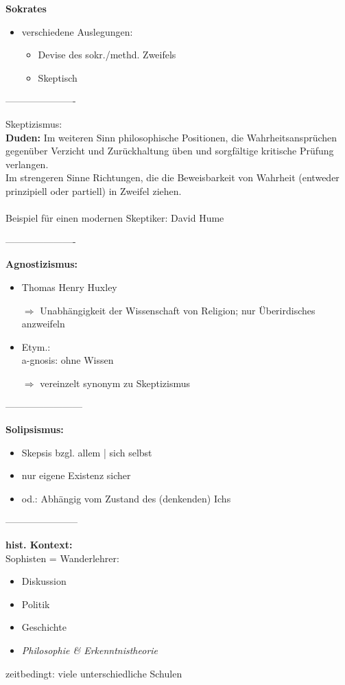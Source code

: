 \documentclass[12pt,a4paper]{article}
\begin{document}
\textbf{Sokrates}
\begin{itemize}
\item verschiedene Auslegungen:
\begin{itemize}
\item Devise des sokr./methd. Zweifels
\item Skeptisch
\end{itemize}
\end{itemize}

----------------------

Skeptizismus:\\
\textbf{Duden:} \glqq Im weiteren Sinn philosophische Positionen, die Wahrheitsansprüchen gegenüber Verzicht und Zurückhaltung üben und sorgfältige kritische Prüfung verlangen.\\
Im strengeren Sinne Richtungen, die die Beweisbarkeit von Wahrheit (entweder prinzipiell oder partiell) in Zweifel ziehen.\grqq\\
\ \\
Beispiel für einen modernen Skeptiker: David Hume

----------------------

\textbf{Agnostizismus:}
\begin{itemize}
\item Thomas Henry Huxley
\item[$\Rightarrow$] Unabhängigkeit der Wissenschaft von Religion; nur Überirdisches anzweifeln
\item Etym.: \\
a-gnosis: \glqq ohne Wissen\grqq\
\item[$\Rightarrow$] vereinzelt synonym zu Skeptizismus
\end{itemize}

------------------------

\textbf{Solipsismus:}
\begin{itemize}
\item Skepsis bzgl. allem | sich selbst
\item nur eigene Existenz sicher
\item od.: Abhängig vom Zustand des (denkenden) Ichs
\end{itemize}

-----------------------

\textbf{hist. Kontext:}\\
Sophisten = Wanderlehrer:
\begin{itemize}
\item Diskussion
\item Politik
\item Geschichte
\item \emph{Philosophie \& Erkenntnistheorie}
\end{itemize}
zeitbedingt: viele unterschiedliche Schulen
\end{document}
